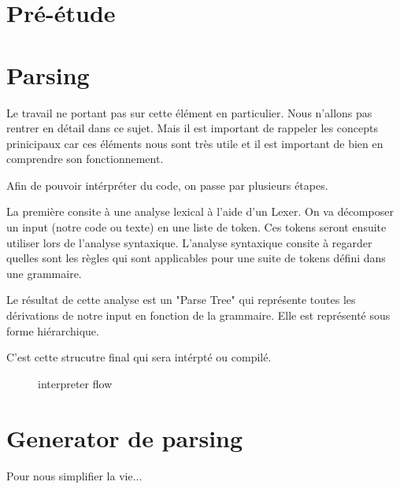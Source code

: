 \documentclass[
    iict, %
    il, %
]{heig-tb}
\begin{document}
\chapter{Pré-étude}

\chapter{Parsing}
Le travail ne portant pas sur cette élément en particulier. Nous n'allons pas rentrer en détail dans ce sujet.
Mais il est important de rappeler les concepts prinicipaux car ces éléments nous sont très utile et il est important de bien en comprendre son fonctionnement.

Afin de pouvoir intérpréter du code, on passe par plusieurs étapes.

La première consite à une analyse lexical à l'aide d'un Lexer. On va décomposer un input (notre code ou texte) en une liste de token.
Ces tokens seront ensuite utiliser lors de l'analyse syntaxique. L'analyse syntaxique consite à regarder quelles sont les règles qui sont applicables pour une suite de tokens défini dans une grammaire.

Le résultat de cette analyse est un "Parse Tree" qui représente toutes les dérivations de notre input en fonction de la grammaire.
Elle est représenté sous forme hiérarchique.

C'est cette strucutre final qui sera intérpté ou compilé.

\begin{figure}[!h]
    \begin{center}
    \end{center}
    \caption[interpreter-flow Anatomy]{\label{interpreter-flow} interpreter flow}
\end{figure}


\chapter{Generator de parsing}

Pour nous simplifier la vie...
\end{document}
